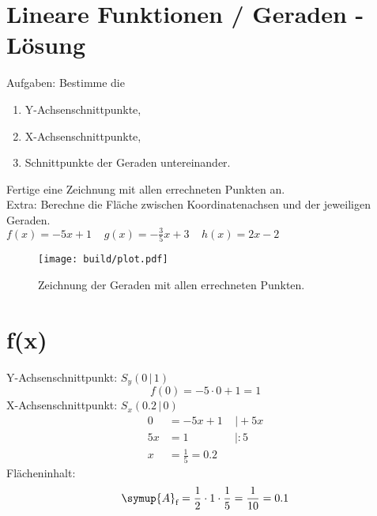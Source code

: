 

      \section*{Lineare Funktionen / Geraden - Lösung}
      Aufgaben: Bestimme die
      \begin{enumerate}
            \item Y-Achsenschnittpunkte,
            \item X-Achsenschnittpunkte,
            \item Schnittpunkte der Geraden untereinander.
      \end{enumerate}
      Fertige eine Zeichnung mit allen errechneten Punkten an.\\
      Extra: Berechne die Fläche zwischen Koordinatenachsen und der jeweiligen Geraden.
      \\
      $f(x)=-5x+1 \;\;\;\; g(x)=-\frac{3}{5}x+3 \;\;\;\; h(x)=2x-2$

      \begin{figure}
            \centering
            \texttt{[image: build/plot.pdf]}
            \caption{Zeichnung der Geraden mit allen errechneten Punkten.}
      \end{figure}

      \newpage
      \section*{f(x)}
      Y-Achsenschnittpunkt: $S_y (0\,|\,1)$
      \begin{equation}
            f(0)=-5\cdot 0+1=1
      \end{equation}
      X-Achsenschnittpunkt: $S_x (0.2\,|\,0)$
      \begin{align}
            0&=-5x+1\;\;\;\;|\!+\!5x\\
            5x&=1\;\;\;\;\;\;\;\;\;\;\;\;\;\;\;|\!:\!5\\
            x&=\frac{1}{5}=0.2
      \end{align}
      Flächeninhalt:
      \begin{equation}
            \symup{A}_\text{f} = \frac{1}{2}\cdot1\cdot\frac{1}{5}=\frac{1}{10}=0.1
      \end{equation}

